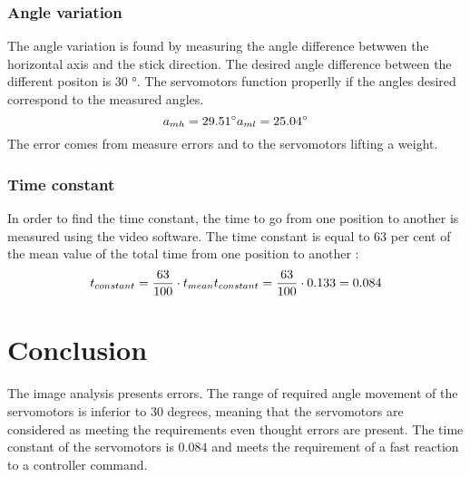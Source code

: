 		\subsubsection*{Angle variation}
		
The angle variation is found by measuring the angle difference betwwen the horizontal axis and the stick direction. The desired angle difference between the different positon is $30$ \si{\degree}. The servomotors function properlly if the angles desired correspond to the measured angles.
\begin{equation}
		a_{mh} = 29.51 \si{\degree} \\  
		a_{ml} = 25.04 \si{\degree}\\ 
\end{equation}
\startexplain
{}
\stopexplain
The error comes from measure errors and to the servomotors lifting a weight.

		\subsubsection*{Time constant}
		
 In order to find the time constant, the time to go from one position to another is measured using the video software. The time constant is equal to 63 per cent of the mean value of the total time from one position to another : 
 \begin{equation}
 t_{constant} = \frac{63}{100} \cdot t_{mean} \\
 t_{constant} = \frac{63}{100} \cdot 0.133 = 0.084
 \end{equation} 
 \startexplain
 \stopexplain
 
 
 

	\section*{Conclusion}
	
The image analysis presents errors. The range of required angle movement of the servomotors is inferior to $30$ degrees, meaning that the servomotors are considered as meeting the requirements even thought errors are present. The time constant of the servomotors is $0.084$ and meets the requirement of a fast reaction to a controller command.





